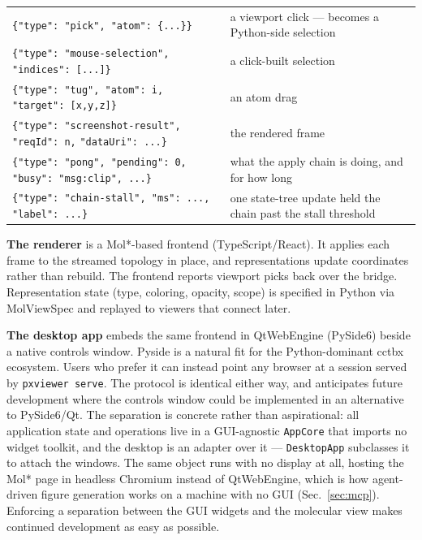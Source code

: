 \documentclass[11pt]{article}
\begin{document}
\begin{table}[H]
\begin{tabular}{@{}p{6.4cm}p{9cm}@{}}
\texttt{\{"type": "pick", "atom": \{...\}\}} & a viewport click ---
becomes a Python-side selection \\
\texttt{\{"type": "mouse-selection", "indices": [...]\}} & a click-built
selection \\
\texttt{\{"type": "tug", "atom": i, "target": [x,y,z]\}} & an atom drag \\
\texttt{\{"type": "screenshot-result", "reqId": n,} \texttt{"dataUri":
...\}} & the rendered frame \\
\texttt{\{"type": "pong", "pending": 0, "busy": "msg:clip", ...\}} & what
the apply chain is doing, and for how long \\
\texttt{\{"type": "chain-stall", "ms": ..., "label": ...\}} & one
state-tree update held the chain past the stall threshold \\
\bottomrule
\end{tabular}
\end{table}

\textbf{The renderer} is a Mol*-based frontend (TypeScript/React). It applies
each frame to the streamed topology in place, and representations update
coordinates rather than rebuild. The frontend reports viewport picks back over the
bridge. Representation state (type, coloring, opacity, scope) is specified in
Python via MolViewSpec and replayed to viewers that connect later.

\textbf{The desktop app} embeds the same frontend in QtWebEngine
(PySide6) beside a native controls window. Pyside is a natural fit for the Python-dominant cctbx ecosystem.
Users who prefer it can instead
point any browser at a session served by \texttt{pxviewer serve}.
The protocol is identical either way, and anticipates future development where the controls window could be implemented in an alternative to PySide6/Qt.
The separation is concrete rather than aspirational: all application state
and operations live in a GUI-agnostic \texttt{AppCore} that imports no widget
toolkit, and the desktop is an adapter over it --- \texttt{DesktopApp}
subclasses it to attach the windows. The same object runs with no display at
all, hosting the Mol* page in headless Chromium instead of QtWebEngine, which
is how agent-driven figure generation works on a machine with no GUI
(Sec.~\ref{sec:mcp}).
Enforcing a separation between the GUI widgets and the molecular view makes continued development as easy as possible.
\end{document}
